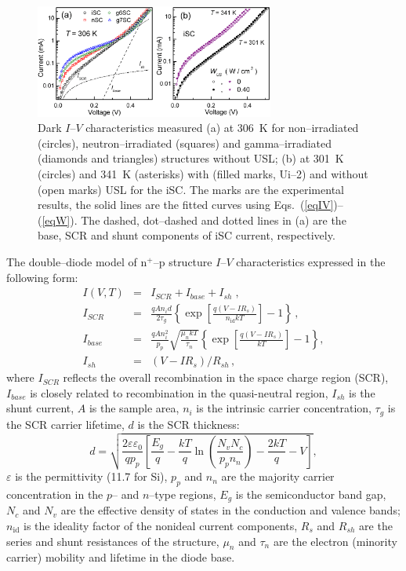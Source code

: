 \documentclass[aip,jap, amsmath,amssymb,reprint]{revtex4-1}
\begin{document}
\begin{figure}
\includegraphics[width=0.7\textwidth]{olikhFig1}%
\caption{\label{figIV}
Dark $I$--$V$ characteristics measured (a) at 306~K for non--irradiated (circles), neutron--irradiated (squares) and gamma--irradiated (diamonds and triangles) structures without USL;
(b) at 301~K (circles) and 341~K (asterisks) with (filled marks, Ui--2) and without (open marks) USL for the iSC.
The marks are the experimental results, the solid lines are the fitted curves using Eqs.~(\ref{eqIV})--(\ref{eqW}).
The dashed, dot--dashed and dotted lines in (a) are the base, SCR and shunt components of iSC current, respectively.
}%
\end{figure}

The double--diode model of n$^+$--p structure $I$--$V$ characteristics expressed in the following form:
\begin{eqnarray}
I(V,T)&=&I_{SCR}+I_{base}+I_{sh}\;,\label{eqIV}\\
I_{SCR}&=&\frac{qAn_id}{2\tau_{g}}\left\{\exp \left[\frac{q(V-IR_s)}{n_{\mathrm{id}}kT}\right]-1\right\}\,,\label{eqIscr}\\
I_{base}&=&\frac{qAn_i^2}{p_p}\sqrt{\frac{\mu_nkT}{\tau_n}}\left\{\exp \left[\frac{q(V-IR_s)}{kT}\right]-1\right\},\label{eqIbase}\\
I_{sh}&=&(V-IR_s)/R_{sh}\,,\label{eqIsh}
\end{eqnarray}
where
$I_{SCR}$ reflects the overall recombination in the space charge region (SCR),
$I_{base}$ is closely related to recombination in the quasi-neutral region,
$I_{sh}$ is the shunt current,
$A$ is the sample area,
$n_i$ is the intrinsic carrier concentration,
$\tau_{g}$ is the SCR carrier lifetime,
$d$ is the  SCR thickness:
\begin{equation}
\label{eqW}
    d=\sqrt{\frac{2 \varepsilon \varepsilon_0}{q p_p}\left[
     \frac{E_g}{q}-\frac{kT}{q}\ln\!\left(\frac{N_vN_c}{p_pn_n}\right)-\frac{2kT}{q}-V\right]},
\end{equation}
$\varepsilon$ is the permittivity (11.7 for Si),
$p_p$ and $n_n$ are the majority carrier concentration in the $p$-- and $n$--type regions,
$E_g$ is the semiconductor band gap,
$N_c$ and $N_v$ are the effective density of states in the conduction and valence bands;
$n_{\mathrm{id}}$ is the ideality factor of the nonideal current components,
$R_s$ and $R_{sh}$ are the series and shunt resistances of the structure,
$\mu_n$ and $\tau_n$ are the electron (minority carrier) mobility and lifetime in the diode base.
\end{document}
